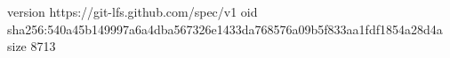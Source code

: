 version https://git-lfs.github.com/spec/v1
oid sha256:540a45b149997a6a4dba567326e1433da768576a09b5f833aa1fdf1854a28d4a
size 8713
